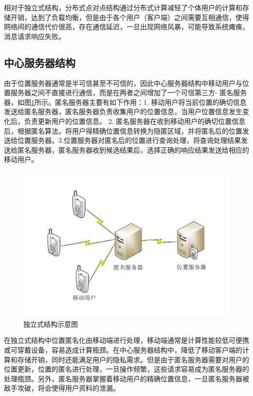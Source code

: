 相对于独立式结构，分布式点对点结构通过分布式计算减轻了个体用户的计算和存储开销，达到了负载均衡，但是由于各个用户（客户端）之间需要互相通信，使得网络间的通信代价很高，存在通信延迟，一旦出现网络风暴，可能导致系统瘫痪，消息请求响应失败。


\subsection{中心服务器结构}
由于位置服务器通常是半可信甚至不可信的，因此中心服务器结构中移动用户与位置服务器之间不直接进行通信，而是在两者之间增加了一个可信第三方- 匿名服务器，如图\ref{fig:centralized_pdf}所示。匿名服务器主要有如下作用：1. 移动用户将当前位置的确切信息发送给匿名服务器，匿名服务器负责收集用户的位置信息，当用户位置信息发生变化后，负责更新用户的位置信息。 2. 匿名服务器在收到移动用户的确切位置信息后，根据匿名算法，将用户得精确位置信息转换为隐匿区域，并将匿名后的位置发送给位置服务器。3.位置服务器对匿名后的位置进行查询处理，将查询处理结果发送给匿名服务器，匿名服务器收到候选结果后，选择正确的响应结果发送给相应的移动用户。

\begin{figure}[H]
\centering
\includegraphics[width=12cm]{fig/centralized.pdf}
\caption{独立式结构示意图} %
\label{fig:centralized_pdf}
\end{figure}

在独立式结构中位置匿名化由移动端进行处理，移动端通常是计算性能较低可便携或可穿戴设备，容易造成计算瓶颈。在中心服务器结构中，降低了移动客户端的计算和存储开销，同时还能满足用户的隐私需求。但是由于匿名服务器需要对用户的位置更新，位置的匿名进行处理，一旦操作频繁，这些请求容易成为匿名服务器的处理瓶颈。另外，匿名服务器掌握着移动用户的精确位置信息，一旦匿名服务器被敌手攻破，将会使得用户资料的泄漏。

